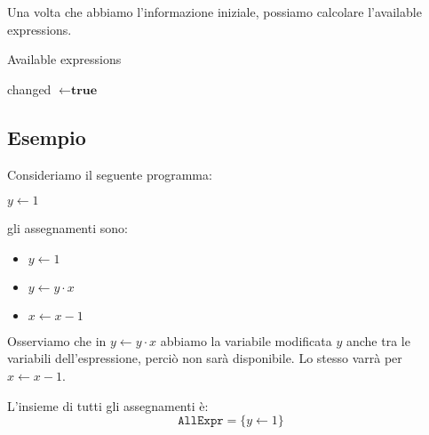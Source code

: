 Una volta che abbiamo l'informazione iniziale, possiamo calcolare l'available expressions.

\begin{algorithm}[H]
    \DontPrintSemicolon
    \caption{Available expressions}
    \label{alg:availablealgorithm}
    changed $ \gets \textbf{true} $\;
\end{algorithm}

\subsection{Esempio}

\begin{minipage}{0.5\textwidth}
    Consideriamo il seguente programma:

    \begin{algorithm}[H]
        $y \gets 1$\;
    \end{algorithm}

    gli assegnamenti sono:
    \begin{itemize}
        \item $y \gets 1$
        \item $y \gets y \cdot x$
        \item $x \gets x - 1$
    \end{itemize}
    Osserviamo che in $y \gets y \cdot x$ abbiamo la variabile modificata
    $y$ anche tra le variabili dell'espressione, perciò non sarà disponibile. 
    Lo stesso varrà per $x \gets x - 1$.

    L'insieme di tutti gli assegnamenti è:
    \[
        \texttt{AllExpr} = \{y \gets 1\}
    \]
    \end{minipage} 
    \begin{minipage}{0.5\textwidth}
    \begin{figure}[H]
        \centering
    \end{figure}
    \end{minipage}

